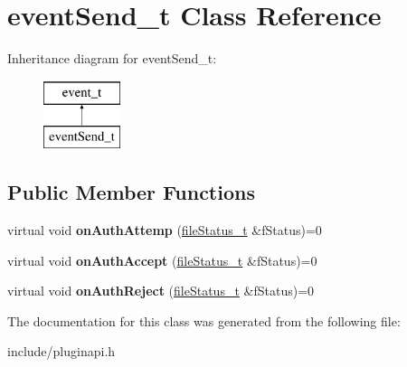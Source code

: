 \hypertarget{classeventSend__t}{\section{event\-Send\-\_\-t \-Class \-Reference}
\label{classeventSend__t}
}
\-Inheritance diagram for event\-Send\-\_\-t\-:\begin{figure}[H]
\begin{center}
\leavevmode
\includegraphics[height=2.000000cm]{classeventSend__t}
\end{center}
\end{figure}
\subsection*{\-Public \-Member \-Functions}
\begin{DoxyCompactItemize}
\item 
\hypertarget{classeventSend__t_a9140332bc5851627780a3d326bd21006}{virtual void {\bfseries on\-Auth\-Attemp} (\hyperlink{classfileStatus__t}{file\-Status\-\_\-t} \&f\-Status)=0}\label{classeventSend__t_a9140332bc5851627780a3d326bd21006}

\item 
\hypertarget{classeventSend__t_a88fe2c5a06438dd32082315f805d1bae}{virtual void {\bfseries on\-Auth\-Accept} (\hyperlink{classfileStatus__t}{file\-Status\-\_\-t} \&f\-Status)=0}\label{classeventSend__t_a88fe2c5a06438dd32082315f805d1bae}

\item 
\hypertarget{classeventSend__t_a568e09e17430f26a556cf2b9e4ac846e}{virtual void {\bfseries on\-Auth\-Reject} (\hyperlink{classfileStatus__t}{file\-Status\-\_\-t} \&f\-Status)=0}\label{classeventSend__t_a568e09e17430f26a556cf2b9e4ac846e}

\end{DoxyCompactItemize}


\-The documentation for this class was generated from the following file\-:\begin{DoxyCompactItemize}
\item 
include/pluginapi.\-h\end{DoxyCompactItemize}
